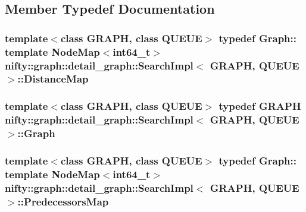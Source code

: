 \subsection{Member Typedef Documentation}
\hypertarget{classnifty_1_1graph_1_1detail__graph_1_1SearchImpl_abbd31f7e73ba6851a8f955cd64d59917}{}
\subsubsection[{Distance\+Map}]{\setlength{\rightskip}{0pt plus 5cm}template$<$class G\+R\+A\+P\+H, class Q\+U\+E\+U\+E$>$ typedef Graph\+:: template Node\+Map$<$int64\+\_\+t$>$ {\bf nifty\+::graph\+::detail\+\_\+graph\+::\+Search\+Impl}$<$ G\+R\+A\+P\+H, Q\+U\+E\+U\+E $>$\+::{\bf Distance\+Map}}\label{classnifty_1_1graph_1_1detail__graph_1_1SearchImpl_abbd31f7e73ba6851a8f955cd64d59917}
\hypertarget{classnifty_1_1graph_1_1detail__graph_1_1SearchImpl_a8426363c518ca7ef2383b5cb1f06713d}{}
\subsubsection[{Graph}]{\setlength{\rightskip}{0pt plus 5cm}template$<$class G\+R\+A\+P\+H, class Q\+U\+E\+U\+E$>$ typedef G\+R\+A\+P\+H {\bf nifty\+::graph\+::detail\+\_\+graph\+::\+Search\+Impl}$<$ G\+R\+A\+P\+H, Q\+U\+E\+U\+E $>$\+::{\bf Graph}}\label{classnifty_1_1graph_1_1detail__graph_1_1SearchImpl_a8426363c518ca7ef2383b5cb1f06713d}
\hypertarget{classnifty_1_1graph_1_1detail__graph_1_1SearchImpl_ae495d858111c13b737fe264a12a273c8}{}
\subsubsection[{Predecessors\+Map}]{\setlength{\rightskip}{0pt plus 5cm}template$<$class G\+R\+A\+P\+H, class Q\+U\+E\+U\+E$>$ typedef Graph\+:: template Node\+Map$<$int64\+\_\+t$>$ {\bf nifty\+::graph\+::detail\+\_\+graph\+::\+Search\+Impl}$<$ G\+R\+A\+P\+H, Q\+U\+E\+U\+E $>$\+::{\bf Predecessors\+Map}}\label{classnifty_1_1graph_1_1detail__graph_1_1SearchImpl_ae495d858111c13b737fe264a12a273c8}


